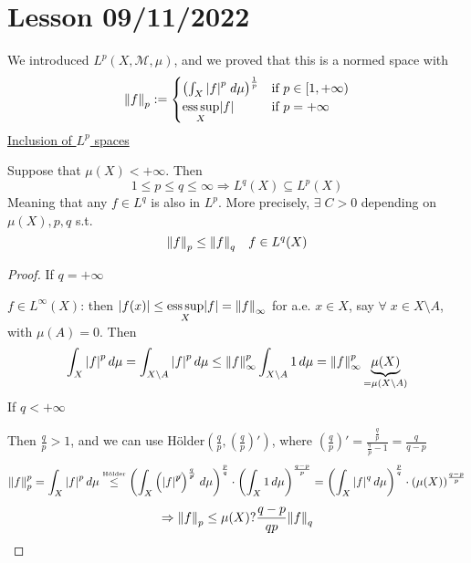 \section{Lesson 09/11/2022}
We introduced \(L^p(X, \mathcal{M}, \mu)\), and we proved that this is a normed space with 
\[
    \norm{f}_p := \begin{cases}
        \left( \int_X \abs{f}^p \; d\mu \right)^{\frac{1}{p}} & \text{if } p\in [1, +\infty) \\
        \underset{X}{\text{ess}\, \text{sup}}\abs{f} & \text{if } p = +\infty
    \end{cases}
\]
\underline{Inclusion of \(L^p\) spaces}
\begin{theorem}
    Suppose that \(\mu(X) < +\infty\). Then 
    \[
        1 \leq p \leq q \leq \infty \Rightarrow L^q(X) \subseteq L^p(X)
    \]
    Meaning that any \(f \in L^q\) is also in \(L^p\). More precisely, \(\exists \; C > 0\) depending on \(\mu(X), p, q\) s.t.
    \[
        \norm{f}_p \leq \norm{f}_q \quad f \in L^q(X)
    \]
\end{theorem}
\begin{proof}
    If \(q = +\infty\)
    
    \(f \in L^\infty(X)\): then \(\abs{f(x)} \leq \underset{X}{\text{ess}\, \text{sup}}\abs{f} = \norm{f}_\infty\) for a.e. \(x \in X\), say \(\forall \; x \in X \setminus A\), with \(\mu(A) = 0\). Then 
    \[
        \int_X \abs{f}^p \, d\mu = \int_{X\setminus A} \abs{f}^p \, d\mu \leq \norm{f}_{\infty}^p \int_{X\setminus A} 1 \,d\mu = \norm{f}_\infty^p \underbrace{\mu(X)}_{= \mu(X\setminus A)}
    \]
    If \(q < +\infty\)

    Then \(\frac{q}{p} > 1\), and we can use Hölder\(\left(\frac{q}{p},\left( \frac{q}{p} \right)' \right)\), where \(\left( \frac{q}{p} \right)' = \frac{\frac{q}{p}}{\frac{q}{p}-1} = \frac{q}{q-p}\)
    \[
        \norm{f}_p^p = \int_X \abs{f}^p \, d\mu \overset{\text{\tiny{Hölder}}}{\leq} \left( \int_X \left( \abs{f}^{\not p} \right)^{\frac{q}{\not p}} \, d\mu\right)^{\frac{p}{q}}\cdot \left( \int_X 1 \, d\mu \right)^{\frac{q-p}{p}} = \left( \int_X \abs{f}^{q} \, d\mu\right)^{\frac{p}{q}}\cdot \left( \mu(X)\right)^{\frac{q-p}{p}}
    \]
    \[
        \Rightarrow \norm{f}_p \leq \mu(X)?{\frac{q-p}{qp}} \norm{f}_q
    \]
\end{proof}
